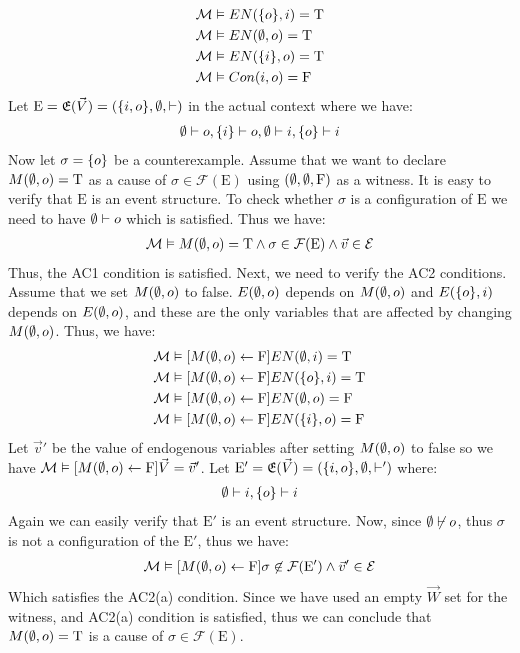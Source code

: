 \begin{example}
\begin{align*}
        \mathcal{M} & \vDash EN(\{o\},i) = \mathrm{T} \\
        \mathcal{M} & \vDash EN(\emptyset,o) = \mathrm{T}    \\
        \mathcal{M} & \vDash EN(\{i\},o) = \mathrm{T} \\
        \mathcal{M} & \vDash Con(i,o) = \mathrm{F}    \\
    \end{align*}
    Let $\mathrm{E} = \mathfrak{E}(\vec V) = (\{i,o\},\emptyset,\vdash)$ 
    in the actual context where we have:
    \begin{align*}
        \emptyset \vdash o, \{i\} \vdash o, \emptyset \vdash i, \{o\} \vdash i
    \end{align*}
    Now let $\sigma = \{o\}$ be a counterexample.     
    Assume that we want to declare $M(\emptyset,o) = \mathrm{T}$ as a cause of 
    $\sigma \in \mathcal{F}(\mathrm{E})$ using $(\emptyset,\emptyset,\mathrm{F})$ as a witness.
    It is easy to verify that $\mathrm{E}$ is an event structure.
    To check whether $\sigma$ is a configuration of $\mathrm{E}$ we need
    to have $\emptyset \vdash o$ which is satisfied.
    Thus we have:
    \begin{align*}
        \mathcal{M} \vDash M(\emptyset,o) = \mathrm{T} \wedge \sigma \in \mathcal{F}(\mathrm{E}) \wedge \vec v \in \mathcal{E}
    \end{align*}
    Thus, the AC1 condition is satisfied.
    Next, we need to verify the AC2 conditions.
    Assume that we set $M(\emptyset,o)$ to false.
    $E(\emptyset,o)$ depends on $M(\emptyset,o)$ and $E(\{o\},i)$ depends on $E(\emptyset,o)$,
    and these are the only variables that are affected by changing $M(\emptyset,o)$.
    Thus, we have:
    \begin{align*}
        \mathcal{M} & \vDash [M(\emptyset,o)\leftarrow \mathrm{F}] EN(\emptyset,i) = \mathrm{T} \\
        \mathcal{M} & \vDash [M(\emptyset,o)\leftarrow \mathrm{F}] EN(\{o\},i) = \mathrm{T} \\
        \mathcal{M} & \vDash [M(\emptyset,o)\leftarrow \mathrm{F}] EN(\emptyset,o) = \mathrm{F} \\
        \mathcal{M} & \vDash [M(\emptyset,o)\leftarrow \mathrm{F}] EN(\{i\},o) = \mathrm{F} 
    \end{align*}
    Let $\vec v'$ be the value of endogenous variables after setting 
    $M(\emptyset,o)$ to false so we have $\mathcal{M} \vDash [M(\emptyset,o)\leftarrow \mathrm{F}]\vec V = \vec v'$.
    Let $\mathrm{E}' = \mathfrak{E}(\vec V) = (\{i,o\},\emptyset, \vdash')$ where:
    \begin{align*}
        \emptyset \vdash i, \{o\} \vdash i
    \end{align*}
    Again we can easily verify that $\mathrm{E}'$ is an event structure.
    Now, since $\emptyset \not \vdash o$, thus $\sigma$ is not a configuration of
    the $\mathrm{E}'$, thus we have:
    \begin{align*}
        \mathcal{M} \vDash [M(\emptyset,o) \leftarrow \mathrm{F}] \sigma \not \in \mathcal{F}(\mathrm{E'})
        \wedge \vec v' \in \mathcal{E}
    \end{align*}
    Which satisfies the AC2(a) condition.
    Since we have used an empty $\vec W$ set for the witness, and AC2(a)
    condition is satisfied, thus we can conclude that $M(\emptyset,o) = \mathrm{T}$ is a 
    cause of $\sigma \in \mathcal{F}(\mathrm{E})$.
\end{example}

